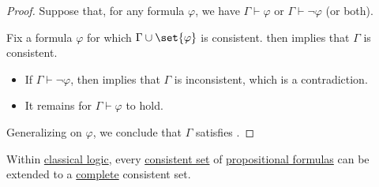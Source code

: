 \begin{proof}
  \NecessitySubProof Suppose that, for any formula \( \varphi \), we have \( \Gamma \vdash \varphi \) or \( \Gamma \vdash \neg \varphi \) (or both).

  Fix a formula \( \varphi \) for which \( \Gamma \cup \set{ \varphi } \) is consistent.  then implies that \( \Gamma \) is consistent.

  \begin{itemize}
    \item If \( \Gamma \vdash \neg \varphi \),  then implies that \( \Gamma \) is inconsistent, which is a contradiction.
    \item It remains for \( \Gamma \vdash \varphi \) to hold.
  \end{itemize}

  Generalizing on \( \varphi \), we conclude that \( \Gamma \) satisfies .
\end{proof}

\begin{proposition}\label{thm:extension_to_complete_consistent_set}
  Within \hyperref[def:classical_logic]{classical logic}, every \hyperref[def:consistent_set_of_sentences]{consistent set} of \hyperref[def:propositional_syntax/formula]{propositional formulas} can be extended to a \hyperref[def:complete_set_of_sentences]{complete} consistent set.
\end{proposition}
